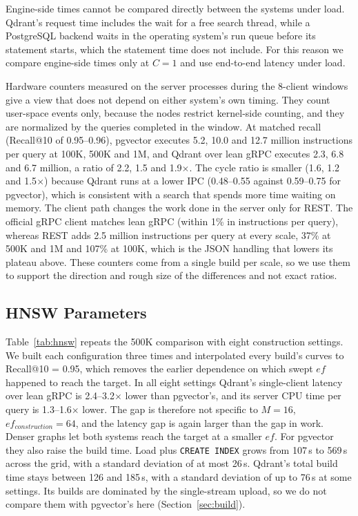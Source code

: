 \documentclass[sigconf, nonacm]{acmart}
\begin{document}
Engine-side times cannot be compared directly between the systems under load. Qdrant's
request time includes the wait for a free search thread, while a PostgreSQL backend
waits in the operating system's run queue before its statement starts, which the
statement time does not include. For this reason we compare engine-side times only at
$C=1$ and use end-to-end latency under load.

Hardware counters measured on the server processes during the 8-client windows give a
view that does not depend on either system's own timing. They count user-space events
only, because the nodes restrict kernel-side counting, and they are normalized by the
queries completed in the window. At matched recall (Recall@10 of 0.95--0.96), pgvector
executes 5.2, 10.0 and 12.7 million instructions per query at 100K, 500K and 1M, and
Qdrant over lean gRPC executes 2.3, 6.8 and 6.7 million, a ratio of 2.2, 1.5 and
1.9$\times$. The cycle ratio is smaller (1.6, 1.2 and 1.5$\times$) because Qdrant runs
at a lower IPC (0.48--0.55 against 0.59--0.75 for pgvector), which is consistent with a
search that spends more time waiting on memory. The client path changes the work done in
the server only for REST. The official gRPC client matches lean gRPC (within 1\% in
instructions per query), whereas REST adds 2.5 million instructions per query at every
scale, 37\% at 500K and 1M and 107\% at 100K, which is the JSON handling that lowers its
plateau above. These counters come from a single build per scale, so we use them to
support the direction and rough size of the differences and not exact ratios.

\subsection{HNSW Parameters}
\label{sec:hnsw}

Table~\ref{tab:hnsw} repeats the 500K comparison with eight construction settings. We
built each configuration three times and interpolated every build's curves to
Recall@10 = 0.95, which removes the earlier dependence on which swept $ef$ happened to
reach the target. In all eight settings Qdrant's single-client latency over lean gRPC is
2.4--3.2$\times$ lower than pgvector's, and its server CPU time per query is
1.3--1.6$\times$ lower. The gap is therefore not specific to $M=16$,
$ef_{construction}=64$, and the latency gap is again larger than the gap in work. Denser
graphs let both systems reach the target at a smaller $ef$. For pgvector they also raise
the build time. Load plus \texttt{CREATE INDEX} grows from 107\,s to 569\,s across the
grid, with a standard deviation of at most 26\,s. Qdrant's total build time stays between
126 and 185\,s, with a standard deviation of up to 76\,s at some settings. Its builds
are dominated by the single-stream upload, so we do not compare them with pgvector's here
(Section~\ref{sec:build}).
\end{document}
